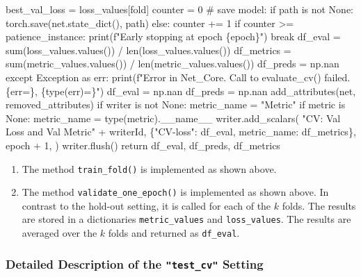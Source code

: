 \documentclass[
  letterpaper,
  DIV=11,
  numbers=noendperiod]{scrreprt}
\newenvironment{Shaded}{\begin{snugshade}}{\end{snugshade}}
\newcommand{\NormalTok}[1]{\textcolor[rgb]{0.00,0.23,0.31}{#1}}
\begin{document}
\begin{Shaded}
\begin{Highlighting}[]
\NormalTok{                    best\_val\_loss = loss\_values[fold]}
\NormalTok{                    counter = 0}
\NormalTok{                    \# save model:}
\NormalTok{                    if path is not None:}
\NormalTok{                        torch.save(net.state\_dict(), path)}
\NormalTok{                else:}
\NormalTok{                    counter += 1}
\NormalTok{                    if counter \textgreater{}= patience\_instance:}
\NormalTok{                        print(f"Early stopping at epoch \{epoch\}")}
\NormalTok{                        break}
\NormalTok{        df\_eval = sum(loss\_values.values()) / len(loss\_values.values())}
\NormalTok{        df\_metrics = sum(metric\_values.values()) / len(metric\_values.values())}
\NormalTok{        df\_preds = np.nan}
\NormalTok{    except Exception as err:}
\NormalTok{        print(f"Error in Net\_Core. Call to evaluate\_cv() failed. \{err=\}, }
\NormalTok{            \{type(err)=\}")}
\NormalTok{        df\_eval = np.nan}
\NormalTok{        df\_preds = np.nan}
\NormalTok{    add\_attributes(net, removed\_attributes)}
\NormalTok{    if writer is not None:}
\NormalTok{        metric\_name = "Metric"}
\NormalTok{        if metric is None:}
\NormalTok{            metric\_name = type(metric).\_\_name\_\_}
\NormalTok{        writer.add\_scalars(}
\NormalTok{            "CV: Val Loss and Val Metric" + writerId,}
\NormalTok{            \{"CV{-}loss": df\_eval, metric\_name: df\_metrics\},}
\NormalTok{            epoch + 1,}
\NormalTok{        )}
\NormalTok{        writer.flush()}
\NormalTok{    return df\_eval, df\_preds, df\_metrics}
\end{Highlighting}
\end{Shaded}

\begin{enumerate}
\def\labelenumi{\arabic{enumi}.}
\setcounter{enumi}{3}
\item
  The method \texttt{train\_fold()} is implemented as shown above.
\item
  The method \texttt{validate\_one\_epoch()} is implemented as shown
  above. In contrast to the hold-out setting, it is called for each of
  the \(k\) folds. The results are stored in a dictionaries
  \texttt{metric\_values} and \texttt{loss\_values}. The results are
  averaged over the \(k\) folds and returned as \texttt{df\_eval}.
\end{enumerate}

\hypertarget{detailed-description-of-the-test_cv-setting}{%
\subsubsection{\texorpdfstring{Detailed Description of the
\texttt{"test\_cv"}
Setting}{Detailed Description of the "test\_cv" Setting}}\label{detailed-description-of-the-test_cv-setting}}
\end{document}
